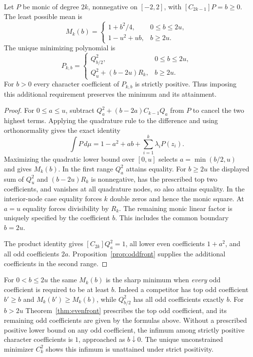 \begin{theorem}\label{thm:evenfront}
Let $P$ be monic of degree $2k$, nonnegative on $[-2,2]$, with
$[C_{2k-1}]P=b\ge0$. The least possible mean is
\[
 M_k(b)=
 \begin{cases}
  1+b^2/4,&0\le b\le 2u,\\
  1-u^2+ub,&b\ge 2u .
 \end{cases}
\]
The unique minimizing polynomial is
\[
 P_{k,b}=
 \begin{cases}
  Q_{b/2}^2,&0\le b\le2u,\\
  Q_u^2+(b-2u)R_k,&b\ge2u .
 \end{cases}
\]
For $b>0$ every character coefficient of $P_{k,b}$ is strictly
positive. Thus imposing this additional requirement preserves the
minimum and its attainment.
\end{theorem}
\begin{proof}
For $0\le a\le u$, subtract $Q_a^2+(b-2a)C_{k-1}Q_a$ from
$P$ to cancel the two highest terms. Applying the quadrature rule to
the difference and using orthonormality gives the exact identity
\[
 \int P\,d\mu=1-a^2+ab+\sum_{i=1}^{k}\lambda_i P(z_i).
\]
Maximizing the quadratic lower bound over $[0,u]$ selects
$a=\min(b/2,u)$ and gives $M_k(b)$. In the first range $Q_a^2$
attains equality. For $b\ge2u$ the displayed sum of $Q_u^2$ and
$(b-2u)R_k$ is nonnegative, has the prescribed top two coefficients,
and vanishes at all quadrature nodes, so also attains equality.
In the interior-node case equality forces $k$ double zeros and hence
the monic square. At $a=u$ equality forces divisibility by $R_k$.
The remaining monic linear factor is uniquely specified by the
coefficient $b$. This includes the common boundary $b=2u$.

The product identity gives $[C_{2k}]Q_a^2=1$, all lower even
coefficients $1+a^2$, and all odd coefficients $2a$.
Proposition~\ref{prop:oddfront} supplies the additional coefficients
in the second range.
\end{proof}

\noindent
For $0<b\le2u$ the same $M_k(b)$ is the sharp minimum when
\emph{every} odd coefficient is required to be at least $b$.
Indeed a competitor has top odd coefficient $b'\ge b$ and
$M_k(b')\ge M_k(b)$, while $Q_{b/2}^2$ has all odd coefficients
exactly $b$. For $b>2u$ Theorem~\ref{thm:evenfront} prescribes the
top odd coefficient, and its remaining odd coefficients are given by
the formulas above. Without a prescribed positive lower bound on any
odd coefficient, the infimum among strictly positive character
coefficients is $1$, approached as $b\downarrow0$. The unique
unconstrained minimizer $C_k^2$ shows this infimum is unattained
under strict positivity.


